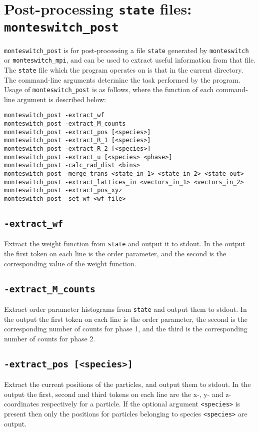 \documentclass{report}
\begin{document}
\section{Post-processing \texttt{state} files: \texttt{monteswitch\_post}}\label{sec:monteswitch_post}
\texttt{monteswitch\_post} is for post-processing a file \texttt{state} generated by \texttt{monteswitch} or \texttt{monteswitch\_mpi}, and can
be used to extract useful information from that file. The \texttt{state} file which the program operates on is that in the current directory.
The command-line arguments determine the task performed by the program. Usage of \texttt{monteswitch\_post} is as follows, where the function 
of each command-line argument is described below:
\begin{verbatim}
monteswitch_post -extract_wf
monteswitch_post -extract_M_counts
monteswitch_post -extract_pos [<species>]
monteswitch_post -extract_R_1 [<species>]
monteswitch_post -extract_R_2 [<species>]
monteswitch_post -extract_u [<species> <phase>]
monteswitch_post -calc_rad_dist <bins>
monteswitch_post -merge_trans <state_in_1> <state_in_2> <state_out>
monteswitch_post -extract_lattices_in <vectors_in_1> <vectors_in_2>
monteswitch_post -extract_pos_xyz
monteswitch_post -set_wf <wf_file>
\end{verbatim}

\subsection{\texttt{-extract\_wf}}
Extract the weight function from \texttt{state} and output it to stdout. In the output the first token on each line is the order parameter, 
and the second is the corresponding value of the weight function.

\subsection{\texttt{-extract\_M\_counts}}
Extract order parameter histograms from \texttt{state} and output them to stdout. In the output the first token on each line is the order 
parameter, the second is the corresponding number of counts for phase 1, and the third is the corresponding number of counts for 
phase 2. 

\subsection{\texttt{-extract\_pos [<species>]}}
Extract the current positions of the particles, and output them to stdout. In the output the first, second and third tokens on each line 
are the x-, y- and z-coordinates respectively for a particle. If the optional argument \texttt{<species>} is present then only the positions
for particles belonging to species \texttt{<species>} are output.
\end{document}

